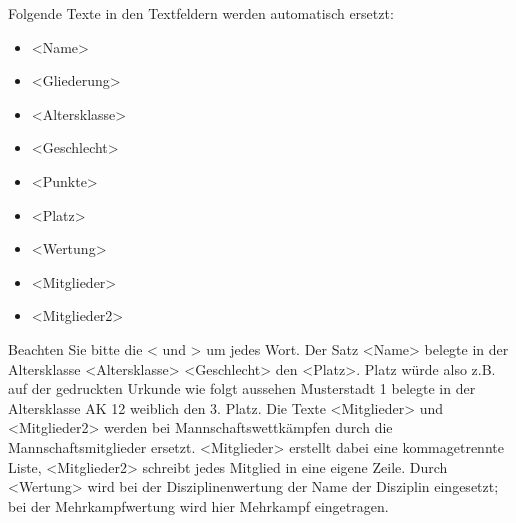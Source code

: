 \documentclass[11pt,a4paper,twoside,ngerman]{article}
\begin{document}
Folgende Texte in den Textfeldern werden automatisch ersetzt:
\begin{itemize}

\item \textless{}Name\textgreater{}


\item \textless{}Gliederung\textgreater{}


\item \textless{}Altersklasse\textgreater{}


\item \textless{}Geschlecht\textgreater{}


\item \textless{}Punkte\textgreater{}


\item \textless{}Platz\textgreater{}


\item \textless{}Wertung\textgreater{}


\item \textless{}Mitglieder\textgreater{}


\item \textless{}Mitglieder2\textgreater{}


\end{itemize}


Beachten Sie bitte die \textless{} und \textgreater{} um jedes Wort. Der Satz \glqq{}\textless{}Name\textgreater{} belegte in der Altersklasse \textless{}Altersklasse\textgreater{} \textless{}Geschlecht\textgreater{} den \textless{}Platz\textgreater{}. Platz\grqq{} würde also z.B. auf der gedruckten Urkunde wie folgt aussehen \glqq{}Musterstadt 1 belegte in der Altersklasse AK 12 weiblich den 3. Platz\grqq{}. Die Texte \textless{}Mitglieder\textgreater{} und \textless{}Mitglieder2\textgreater{} werden bei Mannschaftswettkämpfen durch die Mannschaftsmitglieder ersetzt. \textless{}Mitglieder\textgreater{} erstellt dabei eine kommagetrennte Liste, \textless{}Mitglieder2\textgreater{} schreibt jedes Mitglied in eine eigene Zeile. Durch \textless{}Wertung\textgreater{} wird bei der Disziplinenwertung der Name der Disziplin eingesetzt; bei der Mehrkampfwertung wird hier \glqq{}Mehrkampf\grqq{} eingetragen.
\end{document}
